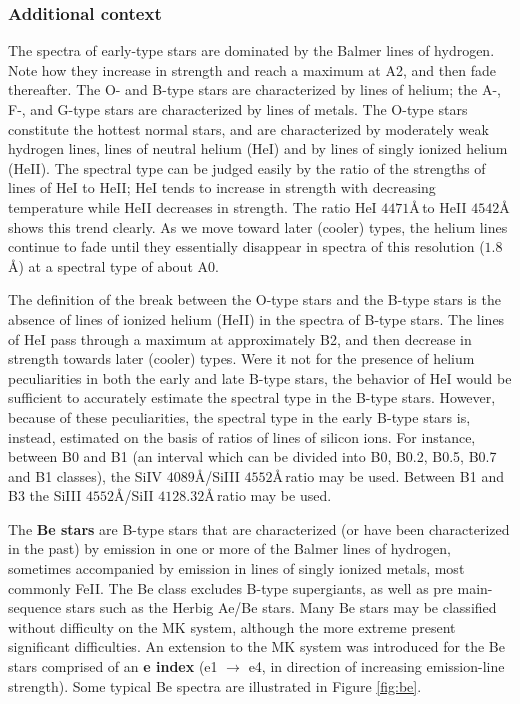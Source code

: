 \documentclass[a4paper,10pt]{article}
\begin{document}
\newpage
\subsubsection{Additional context}

The spectra of early-type stars are dominated by the Balmer lines of hydrogen. Note how they increase in strength and reach a maximum at A2, and then fade thereafter. The O- and B-type stars are characterized by lines of helium; the A-, F-, and
G-type stars are characterized by lines of metals. The O-type stars constitute the hottest normal stars, and are characterized by moderately weak hydrogen lines, lines of neutral helium (HeI) and by lines of singly ionized helium (HeII). The spectral type can be judged easily by the ratio of the strengths of lines of HeI to HeII; HeI tends to increase in strength with decreasing temperature while HeII decreases in strength. The ratio HeI $4471$\AA\,to HeII $4542$\AA\,shows this trend clearly. As we move toward later (cooler) types, the helium lines continue to fade until they essentially disappear in spectra of this resolution ($1.8$\AA) at a spectral type of about A0.

{\noindent}The definition of the break between the O-type stars and the B-type stars is the absence of lines of ionized helium (HeII) in the spectra of B-type stars. The lines of HeI pass through a maximum at approximately B2, and then decrease in strength towards later (cooler) types. Were it not for the presence of helium peculiarities in both the early and late B-type stars, the behavior of HeI would be sufficient to accurately estimate the spectral type in the B-type stars. However, because of these peculiarities, the spectral type in the early B-type stars is, instead, estimated on the basis of ratios of lines of silicon ions. For instance, between B0 and B1 (an interval which can be divided into B0, B0.2, B0.5, B0.7 and B1 classes), the SiIV $4089$\AA/SiIII $4552$\AA\,ratio may be used. Between B1 and B3 the SiIII $4552$\AA/SiII $4128.32$\AA\,ratio may be used.

{\noindent}The \textbf{Be stars} are B-type stars that are characterized (or have been characterized in the past) by emission in one or more of the Balmer lines of hydrogen, sometimes accompanied by emission in lines of singly ionized metals, most commonly FeII. The Be class excludes B-type supergiants, as well as pre main-sequence stars such as the Herbig Ae/Be stars. Many Be stars may be classified without difficulty on the MK system, although the more extreme present significant difficulties. An extension to the MK system was introduced for the Be stars comprised of an \textbf{e index} (e1 $\rightarrow$ e4, in direction of increasing emission-line strength). Some typical Be spectra are illustrated in Figure \ref{fig:be}.
\end{document}
